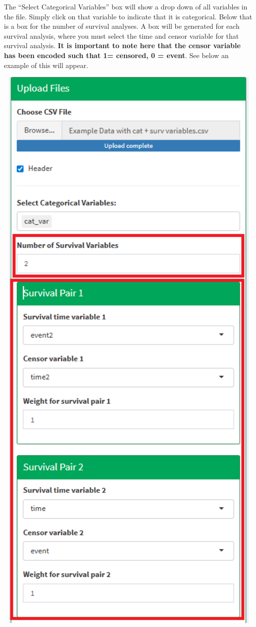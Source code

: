 \documentclass[
]{article}
\begin{document}
The ``Select Categorical Variables'' box will show a drop down of all
variables in the file. Simply click on that variable to indicate that it
is categorical. Below that is a box for the number of survival analyses.
A box will be generated for each survival analysis, where you must
select the time and censor variable for that survival analysis.
\textbf{It is important to note here that the censor variable has been
encoded such that 1= censored, 0 = event}. See below an example of this
will appear.

\begin{center}\includegraphics[width=5.51in]{Survival pair} \end{center}
\end{document}
